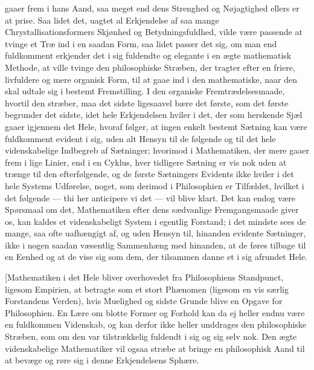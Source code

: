 \documentclass[12pt,a4paper]{book}
\newcommand{\apage}[1]{\marginnote{\footnotesize\textit{[#1]}}}
\begin{document}
gaaer frem i hans Aand, saa meget end dens Strenghed og Nøjagtighed ellers er at
prise. Saa lidet det, uagtet al Erkjendelse af saa mange Chrystallisationsformers
Skjønhed og Betydningsfuldhed, vilde være passende at tvinge et Træ ind i en
saadan Form, saa lidet passer det sig, om man end fuldkomment erkjender det i sig
fuldendte og elegante i en ægte mathematisk Methode, at ville tvinge den
philosophiske Stræben, der tragter efter en friere, livfuldere og mere organisk
Form, til at gaae ind i den mathematiske, naar den skal udtale sig i bestemt
Fremstilling. I den organiske Fremtrædelsesmaade, hvortil den stræber, maa det
sidste ligesaavel bære det første, som det første begrunder det sidste, idet hele
Erkjendelsen hviler i det, der som herskende Sjæl gaaer igjennem det Hele, hvoraf
følger, at ingen enkelt bestemt Sætning kan være fuldkomment evident i sig, uden
alt Hensyn til de følgende og til det hele videnskabelige Indbegreb af Sætninger;
hvorimod i Mathematiken, der mere gaaer frem i lige Linier, end i en Cyklus, hver
tidligere Sætning er vis nok uden at trænge til den efterfølgende, og de første
Sætningers Evidents ikke hviler i det \apage{80} hele Systems Udførelse, noget, som derimod i
Philosophien er Tilfældet, hvilket i det følgende --- thi her anticipere vi det
--- vil blive klart. Det kan endog være Spørsmaal om det, Mathematiken efter dens
sædvanlige Fremgangsmaade giver os, kan kaldes et videnskabeligt System i
egentlig Forstand; i det mindste sees de mange, saa ofte uafhængigt af, og uden
Hensyn til, hinanden evidente Sætninger, ikke i nogen saadan væsentlig Sammenhæng
med hinanden, at de føres tilbage til en Eenhed og at de vise sig som dem, der
tilsammen danne et i sig afrundet Hele.

[Mathematiken i det Hele bliver overhovedet fra Philosophiens Standpunct, ligesom
Empirien, at betragte som et stort Phænomen (ligesom en vis særlig Forstandens
Verden), hvis Muelighed og sidste Grunde blive en Opgave for Philosophien. En
Lære om blotte Former og Forhold kan da ej heller endnu være en fuldkommen
Videnskab, og kan derfor ikke heller unddrages den philosophiske Stræben, som om
den var tilstrækkelig fuldendt i sig og sig selv nok. Den ægte videnskabelige
Mathematiker vil ogsaa stræbe at bringe en philosophisk Aand til at bevæge og
røre sig i denne Erkjendelsens Sphære.
\end{document}
